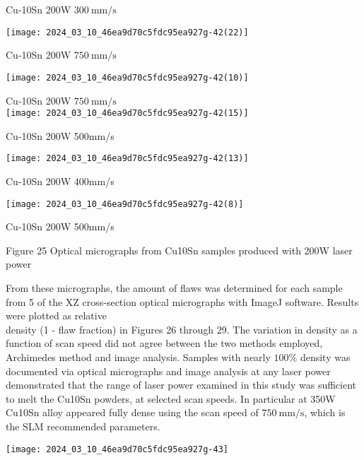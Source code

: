 \documentclass[10pt]{article}
\begin{document}
Cu-10Sn 200W $300 \mathrm{~mm} / \mathrm{s}$

\begin{center}
\texttt{[image: 2024\_03\_10\_46ea9d70c5fdc95ea927g-42(22)]}
\end{center}

Cu-10Sn 200W $750 \mathrm{~mm} / \mathrm{s}$

\begin{center}
\texttt{[image: 2024\_03\_10\_46ea9d70c5fdc95ea927g-42(10)]}
\end{center}

Cu-10Sn 200W $750 \mathrm{~mm} / \mathrm{s}$\\
\texttt{[image: 2024\_03\_10\_46ea9d70c5fdc95ea927g-42(15)]}

Cu-10Sn 200W 500mm/s

\begin{center}
\texttt{[image: 2024\_03\_10\_46ea9d70c5fdc95ea927g-42(13)]}
\end{center}

Cu-10Sn 200W 400mm/s

\begin{center}
\texttt{[image: 2024\_03\_10\_46ea9d70c5fdc95ea927g-42(8)]}
\end{center}

Cu-10Sn 200W 500mm/s

Figure 25 Optical micrographs from Cu10Sn samples produced with 200W laser power

From these micrographs, the amount of flaws was determined for each sample from 5 of the XZ cross-section optical micrographs with ImageJ software. Results were plotted as relative\\
density (1 - flaw fraction) in Figures 26 through 29. The variation in density as a function of scan speed did not agree between the two methods employed, Archimedes method and image analysis. Samples with nearly $100 \%$ density was documented via optical micrographs and image analysis at any laser power demonstrated that the range of laser power examined in this study was sufficient to melt the Cu10Sn powders, at selected scan speeds. In particular at 350W Cu10Sn alloy appeared fully dense using the scan speed of $750 \mathrm{~mm} / \mathrm{s}$, which is the SLM recommended parameters.

\begin{center}
\texttt{[image: 2024\_03\_10\_46ea9d70c5fdc95ea927g-43]}
\end{center}
\end{document}
